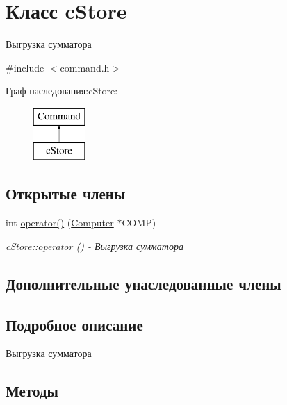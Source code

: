 \hypertarget{classc_store}{}\section{Класс c\+Store}
\label{classc_store}


Выгрузка сумматора  




{\ttfamily \#include $<$command.\+h$>$}

Граф наследования\+:c\+Store\+:\begin{figure}[H]
\begin{center}
\leavevmode
\includegraphics[height=2.000000cm]{classc_store}
\end{center}
\end{figure}
\subsection*{Открытые члены}
\begin{DoxyCompactItemize}
\item 
int \hyperlink{classc_store_a4822a996170072d5c9befde5281b6276}{operator()} (\hyperlink{class_computer}{Computer} $\ast$C\+O\+MP)
\begin{DoxyCompactList}\small\item\em c\+Store\+::operator () -\/ Выгрузка сумматора \end{DoxyCompactList}\end{DoxyCompactItemize}
\subsection*{Дополнительные унаследованные члены}


\subsection{Подробное описание}
Выгрузка сумматора 

\subsection{Методы}
\hypertarget{classc_store_a4822a996170072d5c9befde5281b6276}{}\label{classc_store_a4822a996170072d5c9befde5281b6276} 
